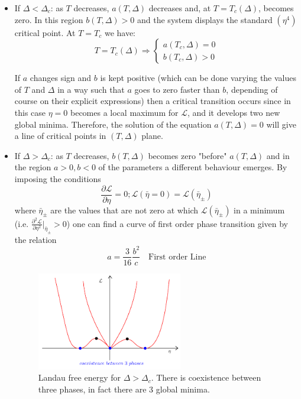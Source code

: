 \documentclass[../../Main/Main.tex]{subfiles}
\begin{document}
\begin{itemize}

\item If \( \Delta < \Delta _c \): as \( T \) decreases, \( a(T,\Delta ) \) decreases and, at \( T = T_c (\Delta ) \), becomes zero. In this region \( b(T,\Delta ) >0 \) and the system displays the standard \( (\eta ^4) \) critical point. At \( T= T_c \) we have:
\begin{equation*}
  T = T_c (\Delta ) \Rightarrow \begin{cases}
    a (T_c,\Delta ) = 0 \\
    b (T_c,\Delta ) > 0
\end{cases}
\end{equation*}

If \( a \) changes sign and  \( b \) is kept positive (which can be done varying the values of \( T \) and \( \Delta  \) in a way such that \( a \) goes to zero faster than \( b \), depending of course on their explicit expressions) then a critical transition occurs since in this case \( \eta =0 \)  becomes a local maximum for \( \mathcal{L} \), and it develops two new global minima. Therefore, the solution of the equation  \( a(T,\Delta )=0 \)  will give a line of critical points in  \( (T,\Delta ) \) plane.

\item If \( \Delta > \Delta _c \): as \( T \) decreases, \( b(T,\Delta ) \) becomes zero "before" \( a(T,\Delta ) \) and in the region $a > 0, b<0$ of the parameters a different behaviour emerges.
By imposing the conditions 
$$\frac{ \partial \mathcal{L} }{ \partial \eta } = 0; \mathcal{L}(\bar{\eta} = 0) = \mathcal{L}(\bar{\eta}_{\pm})$$
where $\bar{\eta}_{\pm}$ are the values that are not zero at which $\mathcal{L}(\bar{\eta}_{\pm})$ in a minimum (i.e. $\frac{ \partial ^2 \mathcal{L} }{ \partial \eta^{2}  }\bigg\rvert_{\bar{\eta}_{\pm}} > 0$) one can find a curve of first order phase transition given by the relation
$$a = \frac{3}{16} \frac{b^{2}}{c}\quad  \text{First order Line}$$



\begin{figure}[H]
\centering
\includegraphics[width=0.6\textwidth]{./img/7.pdf}
\caption{\label{fig:16_7} Landau free energy for \( \Delta > \Delta _c \). There is coexistence between three phases, in fact there are 3 global minima.}
\end{figure}





\end{itemize}
\end{document}
